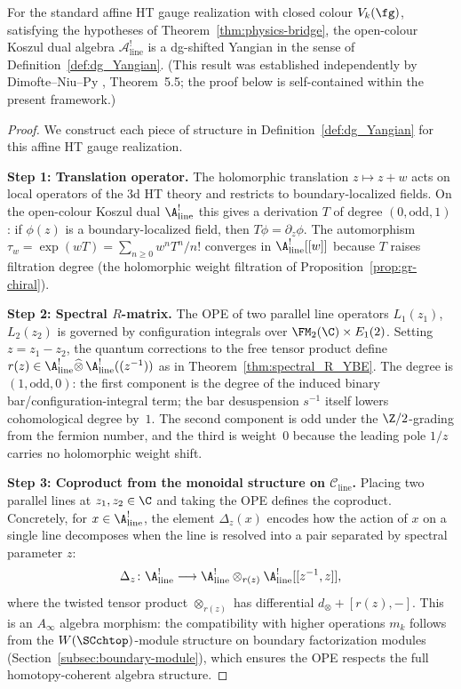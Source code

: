 \begin{theorem}
\label{thm:Koszul_dual_Yangian}
For the standard affine
HT gauge realization with closed colour $V_k(\fg)$, satisfying the
hypotheses of Theorem~\ref{thm:physics-bridge}, the open-colour
Koszul dual algebra $\mathcal{A}^!_{\mathrm{line}}$ is a
dg-shifted Yangian in the sense of Definition~\ref{def:dg_Yangian}.
\textup{(}This result was established independently by Dimofte--Niu--Py
\textup{\cite{DNP25}}, Theorem~5.5; the proof below is self-contained
within the present framework.\textup{)}
\end{theorem}

\begin{proof}
We construct each piece of structure in
Definition~\ref{def:dg_Yangian} for this affine HT gauge
realization.

\medskip
\noindent\textbf{Step 1: Translation operator.}
The holomorphic translation $z \mapsto z + w$ acts on local operators
of the 3d HT theory and restricts to boundary-localized fields. On the
open-colour Koszul dual $\A^!_{\mathrm{line}}$ this gives a derivation
$T$ of degree $(0,\text{odd},1)$: if $\phi(z)$ is a boundary-localized
field, then $T\phi=\partial_z\phi$. The automorphism
$\tau_w=\exp(wT)=\sum_{n\geq0}w^nT^n/n!$ converges in
$\A^!_{\mathrm{line}}[[w]]$ because $T$ raises filtration degree (the
holomorphic weight filtration of Proposition~\ref{prop:gr-chiral}).

\medskip
\noindent\textbf{Step 2: Spectral $R$-matrix.}
The OPE of two parallel line operators $L_1(z_1)$, $L_2(z_2)$ is governed by configuration integrals over $\FM_2(\C) \times E_1(2)$. Setting $z = z_1 - z_2$, the quantum corrections to the free tensor product define $r(z) \in \A^!_{\mathrm{line}} \widehat{\otimes}\, \A^!_{\mathrm{line}}((z^{-1}))$ as in Theorem~\ref{thm:spectral_R_YBE}. The degree is $(1, \text{odd}, 0)$: the first component is the degree of the induced binary bar/configuration-integral term; the bar desuspension $s^{-1}$ itself lowers cohomological degree by~$1$. The second component is odd under the $\Z/2$-grading from the fermion number, and the third is weight~$0$ because the leading pole $1/z$ carries no holomorphic weight shift.

\medskip
\noindent\textbf{Step 3: Coproduct from the monoidal structure on $\mathcal{C}_{\mathrm{line}}$.}
Placing two parallel lines at $z_1, z_2 \in \C$ and taking the OPE defines the coproduct. Concretely, for $x \in \A^!_{\mathrm{line}}$, the element $\Delta_z(x)$ encodes how the action of $x$ on a single line decomposes when the line is resolved into a pair separated by spectral parameter $z$:
\[
\Delta_z \colon \A^!_{\mathrm{line}} \longrightarrow \A^!_{\mathrm{line}} \otimes_{r(z)} \A^!_{\mathrm{line}}[[z^{-1}, z]],
\]
where the twisted tensor product $\otimes_{r(z)}$ has differential $d_{\otimes} + [r(z), -]$. This is an $A_\infty$ algebra morphism: the compatibility with higher operations $m_k$ follows from the $W(\SCchtop)$-module structure on boundary factorization modules (Section~\ref{subsec:boundary-module}), which ensures the OPE respects the full homotopy-coherent algebra structure.


\end{proof}
